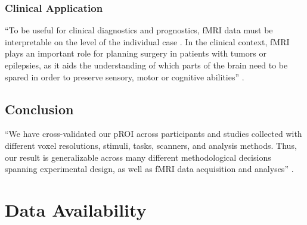 \subsubsection{Clinical Application}


``To be useful for clinical diagnostics and prognostics, fMRI data must be
interpretable on the level of the individual case \citep{dubois2016building}.
%
In the clinical context, fMRI plays an important role for planning surgery in
patients with tumors or epilepsies, as it aids the understanding of which parts
of the brain need to be spared in order to preserve sensory, motor or cognitive
abilities'' \citep{wegrzyn2018thought}.


\subsection{Conclusion}

``We have cross-validated our pROI across participants and studies collected
with different voxel resolutions, stimuli, tasks, scanners, and analysis
methods.
%
Thus, our result is generalizable across many different methodological decisions
spanning experimental design, as well as fMRI data acquisition and analyses''
\citep{weiner2018defining}.


\section{Data Availability}



